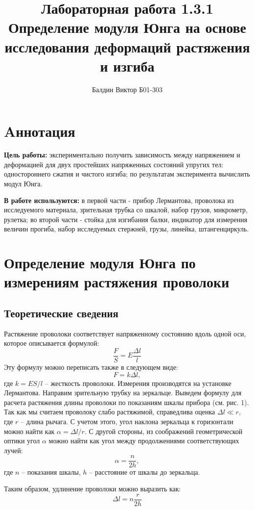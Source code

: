 \documentclass[12pt]{article}
\title{Лабораторная работа 1.3.1 \\
       Определение модуля Юнга на основе исследования деформаций растяжения и изгиба}
\author{Балдин Виктор Б01-303}
\begin{document}
    \maketitle

    \section{Aннотация}
    \par \textbf{Цель работы:} экспериментально получить зависимость между напряжением и деформацией
    для двух простейших напряженных состояний упругих тел: одностороннего сжатия и чистого изгиба;
    по результатам эксперимента вычислить модул Юнга.\\
    \par \noindent \textbf{В работе используются:} в первой части - прибор Лермантова, проволока
    из исследуемого материала,
     зрительная трубка со шкалой,
    набор грузов, микрометр, рулетка;  во второй части - стойка для изгибания балки, индикатор для
    измерения величин прогиба,
набор исследуемых стержней, грузы, линейка, штангенциркуль.

    \section{Определение модуля Юнга по измерениям растяжения проволоки}
    \subsection{Теоретические сведения}
    Растяжение проволоки соответствует напряженному состоянию вдоль одной оси, которое описывается формулой:
\begin{equation}
    \frac{F}{S} = E \frac{\Delta l}{l}
    \label{lermantov}
\end{equation}
    Эту формулу можно переписать также в следующем виде:
    \begin{equation}
        F = k\Delta l,
    \end{equation}
    где $k = ES / l$ -- жесткость проволоки.
    Измерения производятся на установке Лермантова.
    Направим зрительную трубку на зеркальце.
    Выведем формулу для расчета растяжения длины проволоки по показаниям шкалы
    прибора (см. рис. 1).
    Так как мы считаем проволоку слабо растяжимой, справедлива оценка $\Delta l \ll r$, где
    $r$ -- длина рычага. С учетом этого, угол наклона зеркальца к горизонтали можно
    найти как $\alpha = \Delta l/r$. С другой стороны, из соображений геометрической оптики
    угол $\alpha$ можно найти как угол между продолжениями соответствующих лучей:
    \begin{equation}
        \alpha = \frac{n}{2h},
    \end{equation}
    где $n$ -- показания шкалы, $h$ -- расстояние от шкалы до
    зеркальца.
    \par Таким образом, удлинение проволоки можно выразить как:
    \begin{equation}
        \Delta l = n\frac{r}{2h}
        \label{dlina}
    \end{equation}
\end{document}
